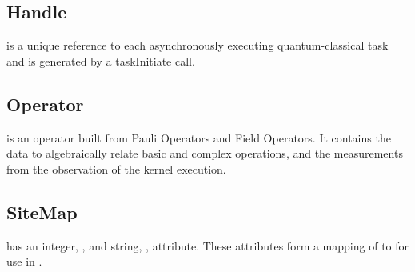 \subsection{\textbf{Handle}}\label{subsec:Handle}
 is a unique reference to each asynchronously executing quantum-classical task and is generated by a taskInitiate call. 

\subsection{\textbf{Operator}}\label{subsec:Operator}
 is an operator built from Pauli Operators and Field Operators.
It contains the data to algebraically relate basic and complex operations, 
and the measurements from the observation of the kernel execution.



\subsection{\textbf{SiteMap}}\label{subsec:Sitemap}
 has an integer, , and string, , attribute. These attributes form a mapping of  to  for use in \Clang. 


